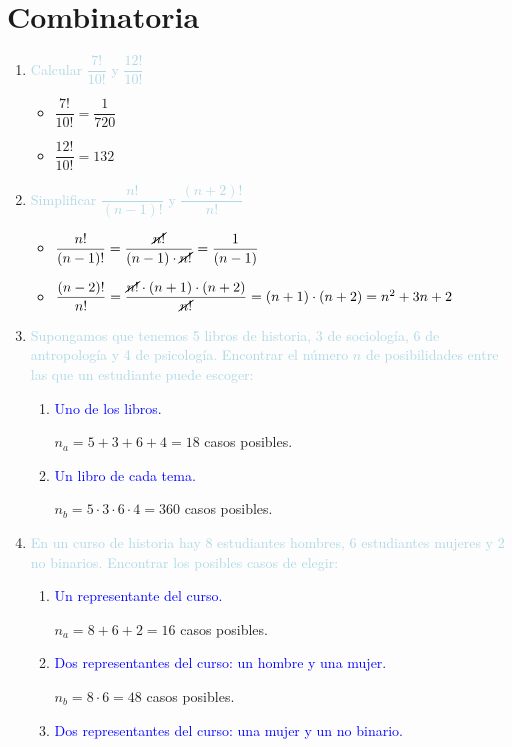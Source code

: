 \documentclass[12pt]{article}
\newcommand{\lb}[1]{\textcolor{lightblue}{#1}}
\newcommand{\db}[1]{\textcolor{blue}{#1}}
\begin{document}
\section{Combinatoria}
\begin{enumerate}[label=\color{red}\textbf{\arabic*)}, leftmargin=*]
	\item \lb{Calcular $\dfrac{7!}{10!}$ y $\dfrac{12!}{10!}$}
    \begin{itemize}[label=$-$]
    \item $\dfrac{7!}{10!}=\dfrac{1}{720}$
    \item $\dfrac{12!}{10!}=132$
    \end{itemize}
    \item \lb{Simplificar $\dfrac{n!}{(n-1)!}$ y $\dfrac{(n+2)!}{n!}$}
    \begin{itemize}[label=$-$]
    \item $\dfrac{n!}{(n-1)!}=\dfrac{\cancel{n!}}{(n-1)\cdot\cancel{n!}}=\dfrac{1}{(n-1)}$
    \item $\dfrac{(n-2)!}{n!}=\dfrac{\cancel{n!}\cdot(n+1)\cdot(n+2)}{\cancel{n!}}=(n+1)\cdot(n+2)=n^2+3n+2$
    \end{itemize}
    \item \lb{Supongamos que tenemos 5 libros de historia, 3 de sociología, 6 de antropología y 4 de psicología. Encontrar el número $n$ de posibilidades entre las que un estudiante puede escoger:}
    \begin{enumerate}[label=\color{red}\alph*)]
    	\item \db{Uno de los libros.}
        
        $n_a=5+3+6+4=18$ casos posibles.
        \item \db{Un libro de cada tema.}
        
        $n_b=5\cdot3\cdot6\cdot4=360$ casos posibles.
    \end{enumerate}
    \item \lb{En un curso de historia hay 8 estudiantes hombres, 6 estudiantes mujeres y 2 no binarios. Encontrar los posibles casos de elegir:}
    \begin{enumerate}[label=\color{red}\alph*)]
    	\item \db{Un representante del curso.}
        
        $n_a=8+6+2=16$ casos posibles.
        \item \db{Dos representantes del curso: un hombre y una mujer.}
        
        $n_b=8\cdot6=48$ casos posibles.
        \item \db{Dos representantes del curso: una mujer y un no binario.}
        

\end{enumerate}
\end{enumerate}
\end{document}
